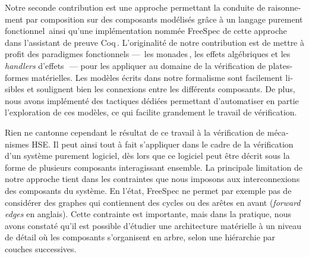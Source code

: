 \begin{otherlanguage}{french}
  Notre seconde contribution est une approche permettant la conduite de
  raisonnement par composition sur des composants modélisés grâce à un langage
  purement fonctionnel\,\cite{letan2018freespec} ainsi qu’une implémentation
  nommée FreeSpec de cette approche\,\cite{letan2018freespeccode} dans
  l’assistant de preuve Coq\,\cite{coq}.
  L’originalité de notre contribution est de mettre à profit des paradigmes
  fonctionnels ---~les monades\,\cite{jones2005io}, les effets algébriques et
  les \emph{handlers} d’effets\,\cite{bauer2015effects}~--- pour les appliquer
  au domaine de la vérification de plates-formes matérielles.
  Les modèles écrits dans notre formalisme sont facilement lisibles et soulignent bien les
  connexions entre les différents composants.
  De plus, nous avons implémenté des tactiques dédiées permettant d’automatiser
  en partie l’exploration de ces modèles, ce qui facilite grandement le travail
  de vérification.

  Rien ne cantonne cependant le résultat de ce travail à la vérification de mécanismes HSE.
  Il peut ainsi tout à fait s’appliquer dans le cadre de la
  vérification d’un système purement logiciel, dès lors que ce logiciel peut être décrit sous la forme de
   plusieurs composants interagissant ensemble.
  La principale limitation de notre approche tient dans les contraintes que nous
  imposons aux interconnexions des composants du système.
  En l’état, FreeSpec ne permet par exemple pas de considérer des graphes qui
  contiennent des cycles ou des \og{} arêtes en avant \fg{} (\emph{forward
    edges} en anglais).
  Cette contrainte est importante, mais dans la pratique, nous avons constaté
  qu’il est possible d’étudier une architecture matérielle à un niveau de détail
  où les composants s’organisent en arbre, selon une hiérarchie par couches
  successives.


\end{otherlanguage}
